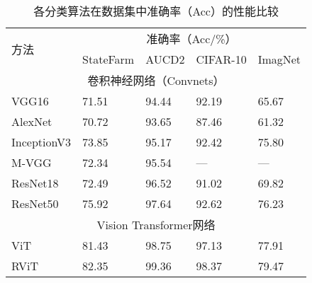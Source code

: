 \begin{table}[!ht]
	\caption{各分类算法在数据集中准确率（Acc）的性能比较}
	\label{表3.3}
	\renewcommand{\arraystretch}{1.5}
	\centering
	\begin{tabular}{p{2.5cm}<{\centering}p{2.5cm}<{\centering}p{2.5cm}<{\centering}p{2.5cm}<{\centering}p{2.5cm}<{\centering}}
		\bottomrule
		\multirow{2}{*}{方法} & \multicolumn{4}{c}{准确率（Acc/\%）}                                                                               \\ \cline{2-5} 
		& StateFarm                 & AUCD2                     & CIFAR-10                  & ImagNet                   \\ \midrule
		\multicolumn{5}{c}{卷积神经网络（Convnets）}                                                                                                \\ \midrule
		VGG16               & 71.51                     & 94.44                     & 92.19                     & 65.67                     \\
		AlexNet             & 70.72                     & 93.65                     & 87.46                     & 61.32                     \\
		InceptionV3         & 73.85                     & 95.17                     & 92.42                     & 75.80                     \\
		M-VGG               & 72.34                     & 95.54                     & —                         & —                         \\
		ResNet18            & 72.49                     & 96.52                     & 91.02                     & 69.82                     \\
		ResNet50            & 75.92                     & 97.64                     & 92.62                     & 76.23                     \\ \midrule
		\multicolumn{5}{c}{Vision Transformer网络}                                                                                            \\ \midrule
		ViT                 & \multicolumn{1}{l}{81.43} & \multicolumn{1}{l}{98.75} & \multicolumn{1}{l}{97.13} & \multicolumn{1}{l}{77.91} \\
		RViT                & \multicolumn{1}{l}{82.35} & \multicolumn{1}{l}{99.36} & \multicolumn{1}{l}{98.37} & \multicolumn{1}{l}{79.47} \\ \bottomrule
	\end{tabular}
\end{table}

